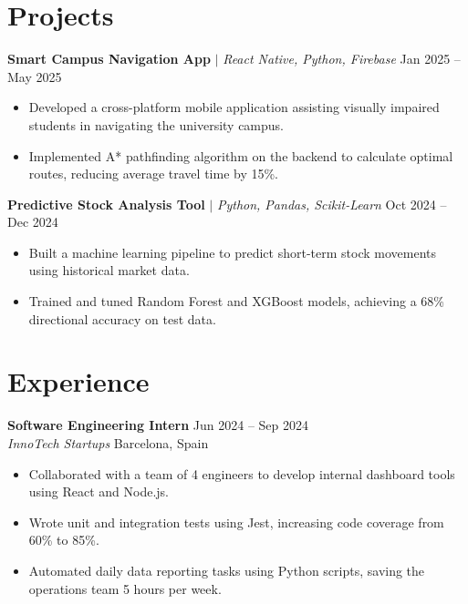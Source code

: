 \documentclass[10pt, a4paper]{article}
\begin{document}
\section*{Projects}
\textbf{Smart Campus Navigation App} $|$ \textit{React Native, Python, Firebase} \hfill Jan 2025 -- May 2025
\begin{itemize}[leftmargin=0.2in, nosep]
    \item Developed a cross-platform mobile application assisting visually impaired students in navigating the university campus.
    \item Implemented A* pathfinding algorithm on the backend to calculate optimal routes, reducing average travel time by 15\%.
\end{itemize}
\vspace{1ex}
\textbf{Predictive Stock Analysis Tool} $|$ \textit{Python, Pandas, Scikit-Learn} \hfill Oct 2024 -- Dec 2024
\begin{itemize}[leftmargin=0.2in, nosep]
    \item Built a machine learning pipeline to predict short-term stock movements using historical market data.
    \item Trained and tuned Random Forest and XGBoost models, achieving a 68\% directional accuracy on test data.
\end{itemize}

\section*{Experience}
\textbf{Software Engineering Intern} \hfill Jun 2024 -- Sep 2024 \\
\textit{InnoTech Startups} \hfill Barcelona, Spain
\begin{itemize}[leftmargin=0.2in, nosep]
    \item Collaborated with a team of 4 engineers to develop internal dashboard tools using React and Node.js.
    \item Wrote unit and integration tests using Jest, increasing code coverage from 60\% to 85\%.
    \item Automated daily data reporting tasks using Python scripts, saving the operations team 5 hours per week.
\end{itemize}
\end{document}
